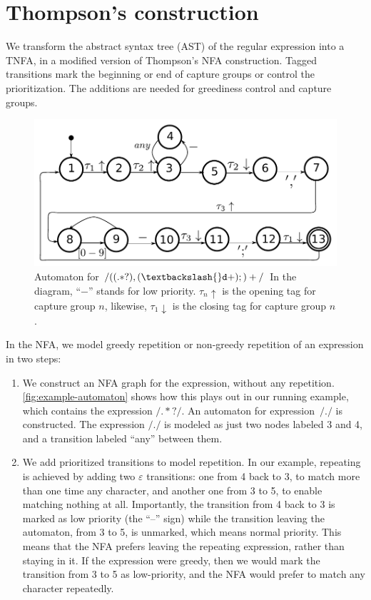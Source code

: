 \documentclass[11pt,a4paper,twoside,openright]{Thesis}
\theoremstyle{definition}
\newcommand{\regex}[1]{\ensuremath{\mathtt{/#1/}}}
\newcommand{\seclabel}[1]{\label{sec:#1}}
\begin{document}
\section{Thompson's construction} 	\seclabel{thompson}

We transform the abstract syntax tree (AST) of the regular expression into a
TNFA, in a modified version of Thompson's NFA construction. Tagged transitions
mark the beginning or end of capture groups or control the prioritization.  The
additions are needed for greediness control and capture groups.

\begin{figure}[htp]
\includegraphics[width=\linewidth]{graphs/lehrer_automaton}

\caption[NFA for \regex{((.*?),(\textbackslash{}d+);)+}]{\label{fig:example-automaton}
Automaton for \regex{((.*?),(\textbackslash{}d+);)+}
In the diagram, ``$-$'' stands for low priority. $\tau_n\uparrow$ is the
opening tag for capture group $n$, likewise, $\tau_1\downarrow$ is the closing
tag for capture group $n$.}
\end{figure}

In the NFA, we model greedy repetition or non-greedy repetition of
an expression in two steps:

\begin{enumerate}
\item We construct an NFA graph for the expression, without any
repetition.  \autoref{fig:example-automaton} shows how this plays
out in our running example, which contains the expression \regex{.*?}.
An automaton for expression~\regex{.} is constructed. The expression
\regex{.} is modeled as just two nodes labeled 3 and 4, and a
transition labeled ``any'' between them.

\item We add prioritized transitions to model repetition. In our
example, repeating is achieved by adding two $\varepsilon$ transitions:
one from 4 back to 3, to match more than one time any character,
and another one from 3 to 5, to enable matching nothing at all.
Importantly, the transition from 4 back to 3 is marked as low
priority (the ``--'' sign) while the transition leaving the automaton,
from 3 to 5, is unmarked, which means normal priority.  This means
that the NFA prefers leaving the repeating expression, rather
than staying in it.  If the expression were greedy, then we would
mark the transition from 3 to 5 as low-priority, and the NFA would
prefer to match any character repeatedly.

\end{enumerate}
\end{document}
